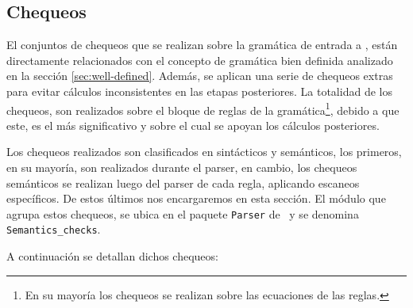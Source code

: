 \subsection*{Chequeos}
\label{subsec:check}

El conjuntos de chequeos que se realizan sobre la gramática de entrada a \maggen, están directamente relacionados con el concepto de gramática bien definida analizado en la sección \ref{sec:well-defined}. Además, se aplican una serie de chequeos extras para evitar cálculos inconsistentes en las etapas posteriores. La totalidad de los chequeos, son realizados sobre el bloque de reglas de la gramática\footnote{En su mayoría los chequeos se realizan sobre las ecuaciones de las reglas.}, debido a que este, es el más significativo y sobre el cual se apoyan los cálculos posteriores.

Los chequeos realizados son clasificados en sintácticos y semánticos, los primeros, en su mayoría, son realizados durante el parser, en cambio, los chequeos semánticos se realizan luego del parser de cada regla, aplicando escaneos específicos. De estos últimos nos encargaremos en esta sección.
El módulo que agrupa estos chequeos, se ubica en el paquete \texttt{Parser} de \maggen\ y se denomina \texttt{Semantics\_checks}.

A continuación se detallan dichos chequeos:

